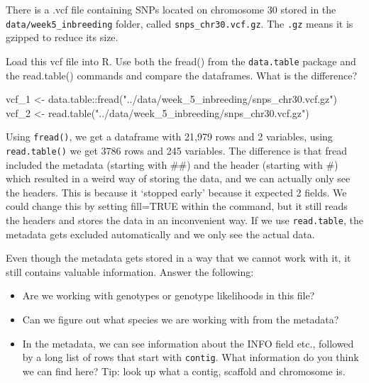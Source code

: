 \documentclass[
  letterpaper,
  DIV=11,
  numbers=noendperiod]{scrreprt}
\newenvironment{Shaded}{}{}
\newcommand{\FunctionTok}[1]{\textcolor[rgb]{0.44,0.26,0.76}{#1}}
\newcommand{\NormalTok}[1]{\textcolor[rgb]{0.14,0.16,0.18}{#1}}
\newcommand{\OtherTok}[1]{\textcolor[rgb]{0.44,0.26,0.76}{#1}}
\newcommand{\SpecialCharTok}[1]{\textcolor[rgb]{0.00,0.36,0.77}{#1}}
\newcommand{\StringTok}[1]{\textcolor[rgb]{0.01,0.18,0.38}{#1}}
\providecommand{\tightlist}{%
  \setlength{\itemsep}{0pt}\setlength{\parskip}{0pt}}\usepackage{longtable,booktabs,array}
\begin{document}
There is a .vcf file containing SNPs located on chromosome 30 stored in
the \texttt{data/week5\_inbreeding} folder, called
\texttt{snps\_chr30.vcf.gz}. The \texttt{.gz} means it is gzipped to
reduce its size.

Load this vcf file into R. Use both the fread() from the
\texttt{data.table} package and the read.table() commands and compare
the dataframes. What is the difference?

\begin{tcolorbox}[enhanced jigsaw, arc=.35mm, left=2mm, titlerule=0mm, rightrule=.15mm, colframe=quarto-callout-tip-color-frame, coltitle=black, colback=white, opacityback=0, bottomtitle=1mm, bottomrule=.15mm, colbacktitle=quarto-callout-tip-color!10!white, breakable, title=\textcolor{quarto-callout-tip-color}{\faLightbulb}\hspace{0.5em}{Code and answer}, toptitle=1mm, toprule=.15mm, opacitybacktitle=0.6, leftrule=.75mm]

\begin{Shaded}
\begin{Highlighting}[]
\NormalTok{vcf\_1 }\OtherTok{\textless{}{-}}\NormalTok{ data.table}\SpecialCharTok{::}\FunctionTok{fread}\NormalTok{(}\StringTok{"../data/week\_5\_inbreeding/snps\_chr30.vcf.gz"}\NormalTok{)}
\NormalTok{vcf\_2 }\OtherTok{\textless{}{-}} \FunctionTok{read.table}\NormalTok{(}\StringTok{"../data/week\_5\_inbreeding/snps\_chr30.vcf.gz"}\NormalTok{)}
\end{Highlighting}
\end{Shaded}

\end{tcolorbox}

Using \texttt{fread()}, we get a dataframe with 21,979 rows and 2
variables, using \texttt{read.table()} we get 3786 rows and 245
variables. The difference is that fread included the metadata (starting
with \#\#) and the header (starting with \#) which resulted in a weird
way of storing the data, and we can actually only see the headers. This
is because it `stopped early' because it expected 2 fields. We could
change this by setting fill=TRUE within the command, but it still reads
the headers and stores the data in an inconvenient way. If we use
\texttt{read.table}, the metadata gets excluded automatically and we
only see the actual data.

Even though the metadata gets stored in a way that we cannot work with
it, it still contains valuable information. Answer the following:

\begin{itemize}
\tightlist
\item
  Are we working with genotypes or genotype likelihoods in this file?
\item
  Can we figure out what species we are working with from the metadata?
\item
  In the metadata, we can see information about the INFO field etc.,
  followed by a long list of rows that start with \texttt{contig}. What
  information do you think we can find here? Tip: look up what a contig,
  scaffold and chromosome is.
\end{itemize}
\end{document}
